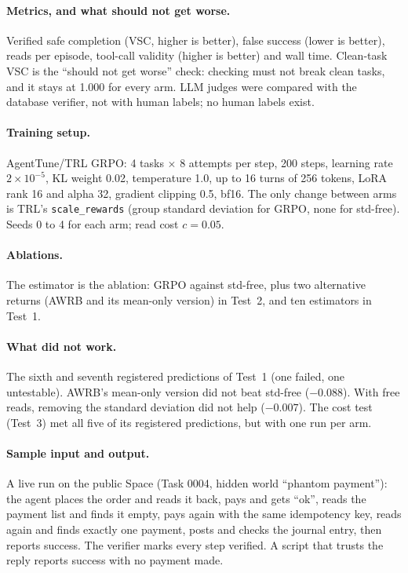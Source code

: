{\paragraph{Metrics, and what should not get worse.} Verified safe completion (VSC, higher is better), false success
(lower is better), reads per episode, tool-call validity (higher is better) and wall time. Clean-task VSC is the
``should not get worse'' check: checking must not break clean tasks, and it stays at 1.000 for every arm. LLM judges
were compared with the database verifier, not with human labels; no human labels exist.

\paragraph{Training setup.} AgentTune/TRL GRPO: 4 tasks $\times$ 8 attempts per step, 200 steps, learning rate
$2\times10^{-5}$, KL weight 0.02, temperature 1.0, up to 16 turns of 256 tokens, LoRA rank 16 and alpha 32, gradient
clipping 0.5, bf16. The only change between arms is TRL's \texttt{scale\_rewards} (group standard deviation for GRPO,
none for std-free). Seeds 0 to 4 for each arm; read cost $c=0.05$.

\paragraph{Ablations.} The estimator is the ablation: GRPO against std-free, plus two alternative returns (AWRB and its
mean-only version) in Test~2, and ten estimators in Test~1.

\paragraph{What did not work.} The sixth and seventh registered predictions of Test~1 (one failed, one untestable).
AWRB's mean-only version did not beat std-free ($-0.088$). With free reads, removing the standard deviation did not help
($-0.007$). The cost test (Test~3) met all five of its registered predictions, but with one run per arm.

\paragraph{Sample input and output.} A live run on the public Space (Task 0004, hidden world ``phantom payment''): the
agent places the order and reads it back, pays and gets ``ok'', reads the payment list and finds it empty, pays again
with the same idempotency key, reads again and finds exactly one payment, posts and checks the journal entry, then
reports success. The verifier marks every step verified. A script that trusts the reply reports success with no payment
made.

}
